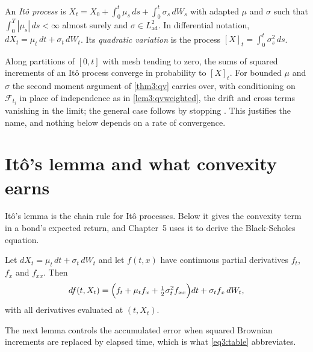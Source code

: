 \begin{chapterrefs}
\begin{definition}\label{def3:itoprocess}
An \emph{It\^o process} is $X_t=X_0+\int_0^t\mu_s\,ds+\int_0^t\sigma_s\,dW_s$ with adapted $\mu$ and
$\sigma$ such that $\int_0^T|\mu_s|\,ds<\infty$ almost surely and $\sigma\in L^2_{\mathrm{ad}}$. In differential notation,
$dX_t=\mu_t\,dt+\sigma_t\,dW_t$. Its \emph{quadratic variation} is the process $[X]_t=\int_0^t\sigma_s^2\,ds$.
\end{definition}

\begin{remark}
Along partitions of $[0,t]$ with mesh tending to zero, the sums of squared increments of an It\^o
process converge in probability to $[X]_t$. For bounded $\mu$ and $\sigma$ the second moment argument of \cref{thm3:qv}
carries over, with conditioning on $\mathcal F_{t_i}$ in place of independence as in \cref{lem3:qvweighted}, the drift and cross terms vanishing in the limit; the general case follows by stopping
\parencite[Section~1.5]{karatzas1998}. This justifies the name, and nothing below depends on a rate of
convergence.
\end{remark}

\FloatBarrier
\section{It\^o's lemma and what convexity earns}
\label{sec3:lemma}

It\^o's lemma is the chain rule for It\^o processes. Below it gives the convexity term in a bond's expected return, and
Chapter~5 uses it to derive the Black-Scholes equation.

\begin{theorem}[It\^o's lemma]\label{thm3:itolemma}
Let $dX_t=\mu_t\,dt+\sigma_t\,dW_t$ and let $f(t,x)$ have continuous partial derivatives $f_t$, $f_x$
and $f_{xx}$. Then
\begin{equation}\label{eq3:itolemma}
  df(t,X_t) = \Bigl(f_t + \mu_t f_x + \tfrac12\sigma_t^2 f_{xx}\Bigr)dt + \sigma_t f_x\,dW_t ,
\end{equation}
with all derivatives evaluated at $(t,X_t)$.
\end{theorem}

The next lemma controls the accumulated error when squared Brownian increments are replaced by elapsed
time, which is what \cref{eq3:table} abbreviates.


\end{chapterrefs}
